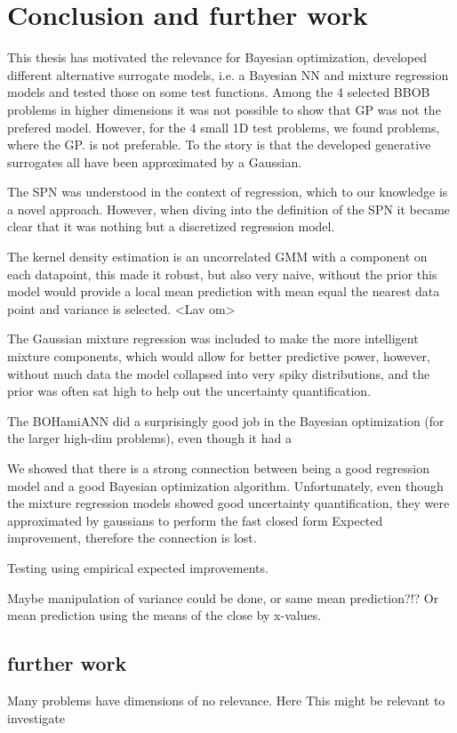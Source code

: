 \chapter{Conclusion and further work}
This thesis has motivated the relevance for Bayesian optimization, developed different alternative
surrogate models, i.e. a Bayesian NN and mixture regression models and tested those on some 
test functions. Among the 4 selected BBOB problems in higher dimensions it was not possible to show that
GP was not the prefered model. However, for the 4 small 1D test problems, we found problems, where the GP. 
is not preferable. To the story is that the developed generative surrogates all have been approximated by
a Gaussian. 

The SPN was understood in the context of regression, which to our knowledge is a novel approach. However, 
when diving into the definition of the SPN it became clear that it was nothing but a discretized regression model. 

The kernel density estimation is an uncorrelated GMM with a component on each datapoint, this made
it robust, but also very naive, without the prior this model would provide a local mean prediction
with mean equal the nearest data point and variance is selected. <Lav om>

The Gaussian mixture regression was included to make the more intelligent mixture components, which
would allow for better predictive power, however, without much data the model collapsed into very
spiky distributions, and the prior was often sat high to help out the uncertainty quantification. 

The BOHamiANN did a surprisingly good job in the Bayesian optimization (for the larger high-dim problems),
even though it had a 

We showed that there is a strong connection between being a good regression model and a good Bayesian optimization
algorithm. Unfortunately, even though the mixture regression models showed good uncertainty quantification,
they were approximated by gaussians to perform the fast closed form Expected improvement, therefore the 
connection is lost. 

Testing using empirical expected improvements. 

Maybe manipulation of variance could be done, or same mean prediction?!? Or 
mean prediction using the means of the close by x-values. 

\section{further work}
Many problems have dimensions of no relevance. Here This might be relevant to investigate

